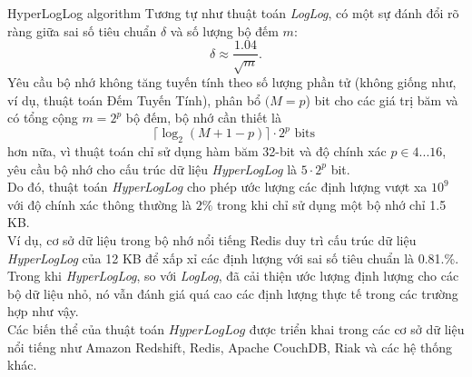 \documentclass[10pt]{beamer}
\begin{document}
\begin{frame}{HyperLogLog algorithm}
  Tương tự như thuật toán \textit{LogLog}, có một sự đánh đổi rõ ràng giữa sai số tiêu chuẩn $\delta$ và số lượng bộ đếm $m$:
  \[\delta \approx \frac{1.04}{\sqrt{m}}.\]
  \indent Yêu cầu bộ nhớ không tăng tuyến tính theo số lượng phần tử (không giống như, ví dụ, thuật toán Đếm Tuyến Tính), 
  phân bổ $(M=p$) bit cho các giá trị băm và có tổng cộng $m = 2^p$ bộ đếm, bộ nhớ cần thiết là
  \[\lceil\log_2\left(M + 1 - p\right)\rceil\cdot2^p \text{ bits }\]
  hơn nữa, vì thuật toán chỉ sử dụng hàm băm 32-bit và độ chính xác $p \in 4...16$, yêu cầu bộ nhớ cho 
  cấu trúc dữ liệu \textit{HyperLogLog} là $5\cdot 2^p$ bit.\\
  Do đó, thuật toán \textit{HyperLogLog} cho phép ước lượng các định lượng vượt xa $10^9$ với độ chính xác thông thường là $2\%$ 
  trong khi chỉ sử dụng một bộ nhớ chỉ 1.5 KB.\\
  Ví dụ, cơ sở dữ liệu trong bộ nhớ nổi tiếng Redis duy trì cấu trúc dữ liệu \textit{HyperLogLog} của 12 KB để xấp xỉ các định lượng 
  với sai số tiêu chuẩn là 0.81.\%.
  Trong khi \textit{HyperLogLog}, so với \textit{LogLog}, đã cải thiện ước lượng định lượng cho các bộ dữ liệu nhỏ, 
  nó vẫn đánh giá quá cao các định lượng thực tế trong các trường hợp như vậy.\\
  Các biến thể của thuật toán $HyperLogLog$ được triển khai trong các cơ sở dữ liệu nổi tiếng như Amazon Redshift, Redis, Apache CouchDB, Riak 
  và các hệ thống khác.
\end{frame}
\end{document}
